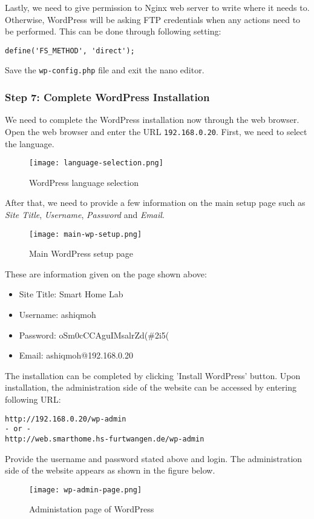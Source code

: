 Lastly, we need to give permission to Nginx web server to write where it needs to. Otherwise, WordPress will be asking FTP credentials when any actions need to be performed. This can be done through following setting:
\begin{lstlisting}
define('FS_METHOD', 'direct');
\end{lstlisting}

Save the \texttt{wp-config.php} file and exit the nano editor.

\subsubsection*{Step 7: Complete WordPress Installation}
We need to complete the WordPress installation now through the web browser. Open the web browser and enter the URL \texttt{192.168.0.20}. First, we need to select the language.

\begin{figure}[h]
\caption{WordPress language selection}
\centering
\texttt{[image: language-selection.png]}
\end{figure}

After that, we need to provide a few information on the main setup page such as \emph{Site Title}, \emph{Username}, \emph{Password} and \emph{Email}.

\begin{figure}[h]
\caption{Main WordPress setup page}
\centering
\texttt{[image: main-wp-setup.png]}
\end{figure}

These are information given on the page shown above:
\begin{itemize}
\item Site Title: Smart Home Lab
\item Username: ashiqmoh
\item Password: oSm0cCCAguIMsalrZd(\#2i5(
\item Email: ashiqmoh@192.168.0.20
\end{itemize}

The installation can be completed by clicking 'Install WordPress' button. Upon installation, the administration side of the website can be accessed by entering following URL:
\begin{lstlisting}
http://192.168.0.20/wp-admin
- or -
http://web.smarthome.hs-furtwangen.de/wp-admin
\end{lstlisting}

Provide the username and password stated above and login. The administration side of the website appears as shown in the figure below.

\begin{figure}[h]
\caption{Administation page of WordPress}
\centering
\texttt{[image: wp-admin-page.png]}
\end{figure}